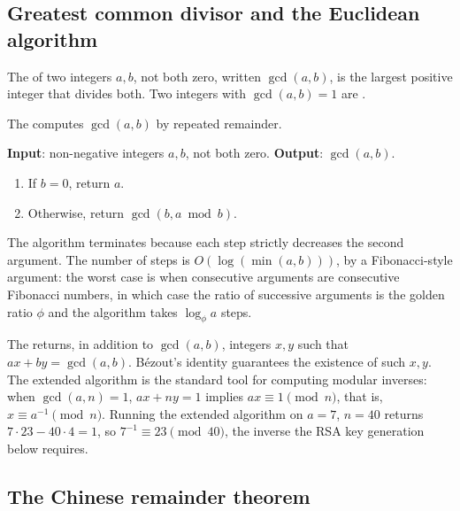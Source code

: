 \subsection{Greatest common divisor and the Euclidean algorithm}

\begin{definition}
The  of two integers $a, b$, not
both zero, written $\gcd(a, b)$, is the largest positive integer
that divides both. Two integers with $\gcd(a, b) = 1$ are
.
\end{definition}

The  computes $\gcd(a, b)$ by repeated
remainder.

\begin{principle}
\textbf{Input}: non-negative integers $a, b$, not both zero.
\textbf{Output}: $\gcd(a, b)$.

\begin{enumerate}[leftmargin=*]
  \item If $b = 0$, return $a$.
  \item Otherwise, return $\gcd(b, a \bmod b)$.
\end{enumerate}
\end{principle}

The algorithm terminates because each step strictly decreases the
second argument. The number of steps is $O(\log(\min(a, b)))$, by
a Fibonacci-style argument: the worst case is when consecutive
arguments are consecutive Fibonacci numbers, in which case the
ratio of successive arguments is the golden ratio $\phi$ and the
algorithm takes $\log_{\phi} a$ steps.

The  returns, in addition to
$\gcd(a, b)$, integers $x, y$ such that $ax + by = \gcd(a, b)$.
B\'{e}zout's identity guarantees the existence of such $x, y$. The
extended algorithm is the standard tool for computing modular
inverses: when $\gcd(a, n) = 1$, $ax + ny = 1$ implies $a x \equiv 1
\pmod{n}$, that is, $x \equiv a^{-1} \pmod{n}$. Running the extended
algorithm on $a = 7$, $n = 40$ returns $7 \cdot 23 - 40 \cdot 4 = 1$,
so $7^{-1} \equiv 23 \pmod{40}$, the inverse the RSA key generation
below requires.

\subsection{The Chinese remainder theorem}


